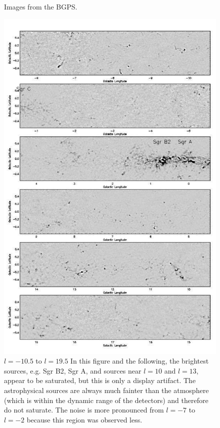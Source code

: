 \documentclass[12pt,preprint]{aastex}
\newcommand{\lon}{\ensuremath{l}}
\begin{document}
\begin{figure}
  \caption{Images from the BGPS.}
  \label{fig:BGPSMontage}
  \addtocounter{figure}{-1}
  \setcounter{subfig}{1}
  \renewcommand{\thefigure}{\arabic{figure}\alph{subfig}}  
  \begin{minipage}{6.5in}
    \begin{center}
      \includegraphics[scale=0.8]{f19a}

      \caption{$\lon=-10.5$ to $\lon=19.5$ In this figure and the
      following, the brightest sources, e.g. Sgr B2, Sgr A, and
      sources near $\lon=10$ and $\lon=13$, appear to be saturated,
      but this is only a display artifact.  The astrophysical sources
      are always much fainter than the atmosphere (which is within the
      dynamic range of the detectors) and therefore do not saturate.
      The noise is more pronounced from $\lon=-7$ to $\lon=-2$ because
      this region was observed less.}

    \end{center}
  \end{minipage}
\end{figure}
\end{document}
